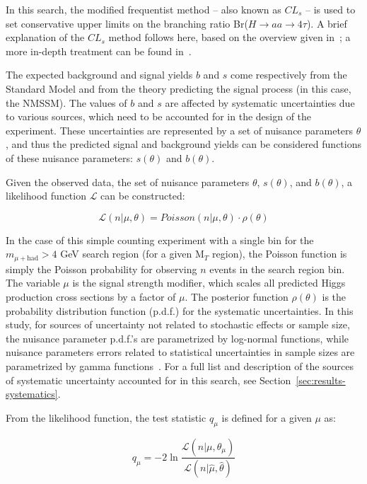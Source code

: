 In this search, the modified frequentist method -- also known as $CL_{s}$ -- is used to set conservative upper limits on the branching ratio Br($H\rightarrow$$aa\rightarrow4\tau$). A brief explanation of the $CL_{s}$ method follows here, based on the overview given in~\cite{CMS-NOTE-2011-005}; a more in-depth treatment can be found in~\cite{Read}.

The expected background and signal yields $b$ and $s$ come respectively from the Standard Model and from the theory predicting the signal process (in this case, the NMSSM). The values of $b$ and $s$ are affected by systematic uncertainties due to various sources, which need to be accounted for in the design of the experiment. These uncertainties are represented by a set of nuisance parameters $\theta$, and thus the predicted signal and background yields can be considered functions of these nuisance parameters: $s(\theta)$ and $b(\theta)$.

Given the observed data, the set of nuisance parameters $\theta$, $s(\theta)$, and $b(\theta)$, a likelihood function $\mathcal{L}$ can be constructed:

\begin{equation}
\mathcal{L}(n \vert \mu,\theta) = Poisson(n \vert \mu,\theta) \cdot \rho(\theta)
\label{eq:likelihood}
\end{equation}

In the case of this simple counting experiment with a single bin for the $m_{\mu+\text{had}} > 4$ GeV search region (for a given M$_T$ region), the Poisson function is simply the Poisson probability for observing $n$ events in the search region bin. The variable $\mu$ is the signal strength modifier, which scales all predicted Higgs production cross sections by a factor of $\mu$. The posterior function $\rho(\theta)$ is the probability distribution function (p.d.f.) for the systematic uncertainties. In this study, for sources of uncertainty not related to stochastic effects or sample size, the nuisance parameter p.d.f.'s are parametrized by log-normal functions, while nuisance parameters errors related to statistical uncertainties in sample sizes are parametrized by gamma functions~\cite{CombinedTwiki}. For a full list and description of the sources of systematic uncertainty accounted for in this search, see Section~\ref{sec:results-systematics}.

From the likelihood function, the test statistic $q_{\mu}$ is defined for a given $\mu$ as:

\begin{equation}
q_{\mu} = -2\ln\frac{\mathcal{L}(n \vert \mu,\hat{\theta}_{\mu})}{\mathcal{L}(n \vert \hat{\mu},\hat{\theta})}
\label{eq:test-statistic}
\end{equation}

